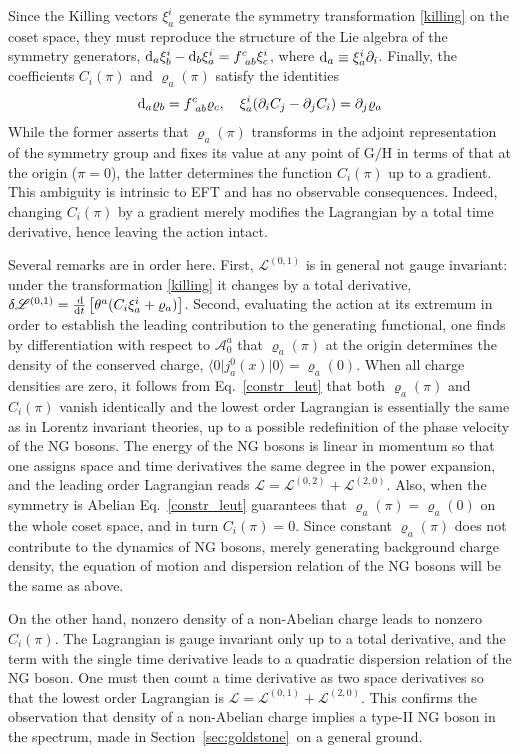 \documentclass[final,3p,times,12pt,a4paper,sort&compress]{elsarticle}
\newcommand\gr[1]{\mathrm{#1}}              %
\newcommand\Lag{\mathscr{L}}                %
\newcommand\AAA{\mathscr{A}}                %
\newcommand\bra[1]{\langle#1\vert}          %
\newcommand\ket[1]{\vert#1\rangle}          %
\newcommand\de{\partial}
\newcommand\vr{\varrho}
\newcommand\vt{\theta}
\newcommand\OD[2]{\frac{\dd #1}{\dd #2}}    %
\newcommand\dd{\mathop{{\rm d}\!}\nolimits} %
\begin{document}
Since the Killing vectors $\xi^i_a$ generate the symmetry transformation
\eqref{killing} on the coset space, they must reproduce the structure of the
Lie algebra of the symmetry generators, $\dd{}_a\xi^i_b-\dd{}_b\xi^i_a=f^c_{\
ab}\xi^i_c$, where $\dd{}_a\equiv\xi^i_a\de_i$. Finally, the coefficients
$C_i(\pi)$ and $\vr_a(\pi)$ satisfy the identities
\begin{equation}
\dd{}_a\vr_b=f^c_{\ ab}\vr_c,\quad \xi^i_a(\de_iC_j-\de_jC_i)=\de_j\vr_a
\label{constr_leut}
\end{equation}
While the former asserts that $\vr_a(\pi)$ transforms in the adjoint
representation of the symmetry group and fixes its value at any point of
$\gr{G/H}$ in terms of that at the origin ($\pi=0$), the latter determines the
function $C_i(\pi)$ up to a gradient. This ambiguity is intrinsic to EFT and has
no observable consequences. Indeed, changing $C_i(\pi)$ by a gradient merely
modifies the Lagrangian by a total time derivative, hence leaving the action
intact.

Several remarks are in order here. First, $\Lag^{(0,1)}$ is in general not
gauge invariant: under the transformation \eqref{killing} it changes by a total
derivative, $\delta\Lag^{(0,1)}=\OD{}{t}\left[\vt^a(C_i\xi^i_a+\vr_a)\right]$.
Second, evaluating the action at its extremum in order to establish the leading
contribution to the generating functional, one finds by differentiation with
respect to $\AAA^a_0$ that $\vr_a(\pi)$ at the origin determines the density of
the conserved charge, $\bra0j^0_a(x)\ket0=\vr_a(0)$. When all charge
densities are zero, it follows from Eq.~\eqref{constr_leut} that both
$\vr_a(\pi)$ and $C_i(\pi)$ vanish identically and the lowest order Lagrangian
is essentially the same as in Lorentz invariant theories, up to a possible
redefinition of the phase velocity of the NG bosons. The energy of the NG
bosons is linear in momentum so that one assigns space and time derivatives the
same degree in the power expansion, and the leading order Lagrangian reads
$\Lag=\Lag^{(0,2)}+\Lag^{(2,0)}$. Also, when the symmetry is Abelian
Eq.~\eqref{constr_leut} guarantees that $\vr_a(\pi)=\vr_a(0)$ on the whole
coset space, and in turn $C_i(\pi)=0$. Since constant $\vr_a(\pi)$ does not
contribute to the dynamics of NG bosons, merely generating background charge
density, the equation of motion and dispersion relation of the NG bosons will
be the same as above.

On the other hand, nonzero density of a non-Abelian charge leads to nonzero
$C_i(\pi)$. The Lagrangian is gauge invariant only up to a total derivative, and
the term with the single time derivative leads to a quadratic dispersion
relation of the NG boson. One must then count a time derivative as two space
derivatives so that the lowest order Lagrangian is
$\Lag=\Lag^{(0,1)}+\Lag^{(2,0)}$. This confirms the observation that density of
a non-Abelian charge implies a type-II NG boson in the spectrum, made in
Section~\ref{sec:goldstone}\ on a general ground.
\end{document}

